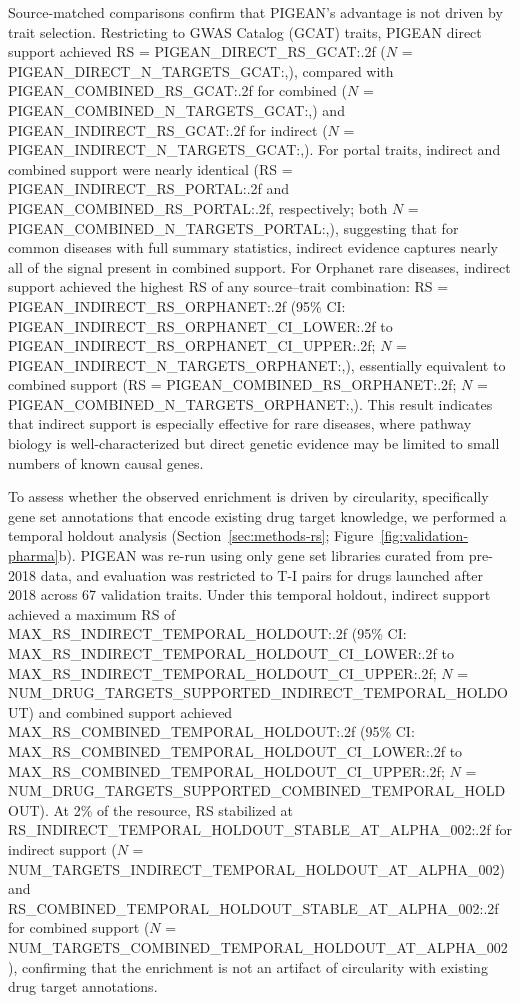 Source-matched comparisons confirm that PIGEAN's advantage is not driven by trait selection. Restricting to GWAS Catalog (GCAT) traits, PIGEAN direct support achieved RS = {{PIGEAN_DIRECT_RS_GCAT:.2f}} ($N$ = {{PIGEAN_DIRECT_N_TARGETS_GCAT:,}}), compared with {{PIGEAN_COMBINED_RS_GCAT:.2f}} for combined ($N$ = {{PIGEAN_COMBINED_N_TARGETS_GCAT:,}}) and {{PIGEAN_INDIRECT_RS_GCAT:.2f}} for indirect ($N$ = {{PIGEAN_INDIRECT_N_TARGETS_GCAT:,}}). For portal traits, indirect and combined support were nearly identical (RS = {{PIGEAN_INDIRECT_RS_PORTAL:.2f}} and {{PIGEAN_COMBINED_RS_PORTAL:.2f}}, respectively; both $N$ = {{PIGEAN_COMBINED_N_TARGETS_PORTAL:,}}), suggesting that for common diseases with full summary statistics, indirect evidence captures nearly all of the signal present in combined support. For Orphanet rare diseases, indirect support achieved the highest RS of any source--trait combination: RS = {{PIGEAN_INDIRECT_RS_ORPHANET:.2f}} (95\% CI: {{PIGEAN_INDIRECT_RS_ORPHANET_CI_LOWER:.2f}} to {{PIGEAN_INDIRECT_RS_ORPHANET_CI_UPPER:.2f}}; $N$ = {{PIGEAN_INDIRECT_N_TARGETS_ORPHANET:,}}), essentially equivalent to combined support (RS = {{PIGEAN_COMBINED_RS_ORPHANET:.2f}}; $N$ = {{PIGEAN_COMBINED_N_TARGETS_ORPHANET:,}}). This result indicates that indirect support is especially effective for rare diseases, where pathway biology is well-characterized but direct genetic evidence may be limited to small numbers of known causal genes.

To assess whether the observed enrichment is driven by circularity, specifically gene set annotations that encode existing drug target knowledge, we performed a temporal holdout analysis (Section~\ref{sec:methods-rs}; Figure~\ref{fig:validation-pharma}b). PIGEAN was re-run using only gene set libraries curated from pre-2018 data, and evaluation was restricted to T-I pairs for drugs launched after 2018 across 67 validation traits. Under this temporal holdout, indirect support achieved a maximum RS of {{MAX_RS_INDIRECT_TEMPORAL_HOLDOUT:.2f}} (95\% CI: {{MAX_RS_INDIRECT_TEMPORAL_HOLDOUT_CI_LOWER:.2f}} to {{MAX_RS_INDIRECT_TEMPORAL_HOLDOUT_CI_UPPER:.2f}}; $N$ = {{NUM_DRUG_TARGETS_SUPPORTED_INDIRECT_TEMPORAL_HOLDOUT}}) and combined support achieved {{MAX_RS_COMBINED_TEMPORAL_HOLDOUT:.2f}} (95\% CI: {{MAX_RS_COMBINED_TEMPORAL_HOLDOUT_CI_LOWER:.2f}} to {{MAX_RS_COMBINED_TEMPORAL_HOLDOUT_CI_UPPER:.2f}}; $N$ = {{NUM_DRUG_TARGETS_SUPPORTED_COMBINED_TEMPORAL_HOLDOUT}}). At 2\% of the resource, RS stabilized at {{RS_INDIRECT_TEMPORAL_HOLDOUT_STABLE_AT_ALPHA_002:.2f}} for indirect support ($N$ = {{NUM_TARGETS_INDIRECT_TEMPORAL_HOLDOUT_AT_ALPHA_002}}) and {{RS_COMBINED_TEMPORAL_HOLDOUT_STABLE_AT_ALPHA_002:.2f}} for combined support ($N$ = {{NUM_TARGETS_COMBINED_TEMPORAL_HOLDOUT_AT_ALPHA_002}}), confirming that the enrichment is not an artifact of circularity with existing drug target annotations.

